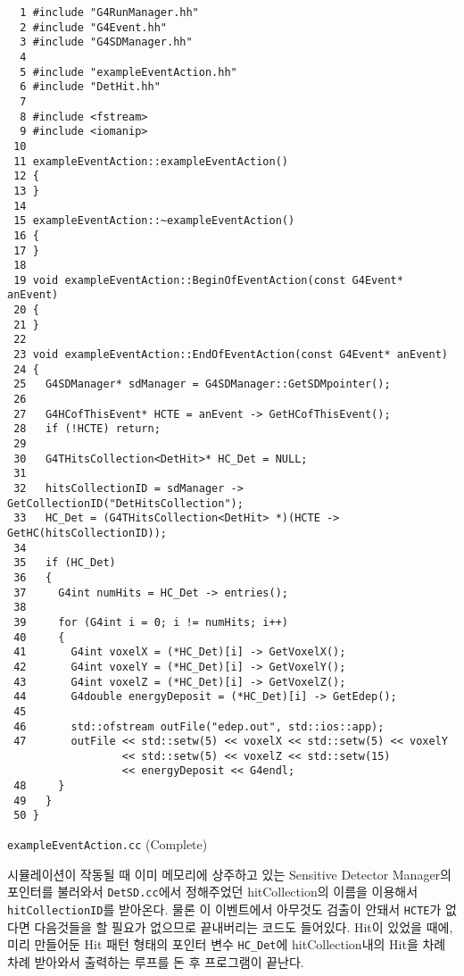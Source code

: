 \begin{code}[p]
\begin{lstlisting}
  1 #include "G4RunManager.hh"
  2 #include "G4Event.hh"
  3 #include "G4SDManager.hh"
  4 
  5 #include "exampleEventAction.hh"
  6 #include "DetHit.hh"
  7 
  8 #include <fstream>
  9 #include <iomanip>
 10 
 11 exampleEventAction::exampleEventAction()
 12 {
 13 }
 14 
 15 exampleEventAction::~exampleEventAction()
 16 {
 17 }
 18 
 19 void exampleEventAction::BeginOfEventAction(const G4Event* anEvent)
 20 {
 21 }
 22 
 23 void exampleEventAction::EndOfEventAction(const G4Event* anEvent)
 24 {
 25   G4SDManager* sdManager = G4SDManager::GetSDMpointer();
 26   
 27   G4HCofThisEvent* HCTE = anEvent -> GetHCofThisEvent();
 28   if (!HCTE) return;
 29
 30   G4THitsCollection<DetHit>* HC_Det = NULL;
 31  
 32   hitsCollectionID = sdManager -> GetCollectionID("DetHitsCollection");
 33   HC_Det = (G4THitsCollection<DetHit> *)(HCTE -> GetHC(hitsCollectionID));
 34   
 35   if (HC_Det)
 36   { 
 37     G4int numHits = HC_Det -> entries();
 38     
 39     for (G4int i = 0; i != numHits; i++)
 40     { 
 41       G4int voxelX = (*HC_Det)[i] -> GetVoxelX();
 42       G4int voxelY = (*HC_Det)[i] -> GetVoxelY();
 43       G4int voxelZ = (*HC_Det)[i] -> GetVoxelZ();
 44       G4double energyDeposit = (*HC_Det)[i] -> GetEdep();
 45       
 46       std::ofstream outFile("edep.out", std::ios::app);
 47       outFile << std::setw(5) << voxelX << std::setw(5) << voxelY
                  << std::setw(5) << voxelZ << std::setw(15)
                  << energyDeposit << G4endl;
 48     }
 49   }
 50 }
\end{lstlisting}
\caption{\texttt{exampleEventAction.cc} (Complete) \label{code-4-15}}
\end{code}

시뮬레이션이 작동될 때 이미 메모리에 상주하고 있는 Sensitive Detector Manager의
포인터를 불러와서 \texttt{DetSD.cc}에서 정해주었던 hitCollection의 이름을
이용해서 \texttt{hitCollectionID}를 받아온다. 물론 이 이벤트에서 아무것도
검출이 안돼서 \texttt{HCTE}가 없다면 다음것들을 할 필요가 없으므로 끝내버리는
코드도 들어있다. Hit이 있었을 때에, 미리 만들어둔 Hit 패턴 형태의 포인터 변수
\texttt{HC\_Det}에 hitCollection내의 Hit을 차례차례 받아와서 출력하는 루프를 돈
후 프로그램이 끝난다.
